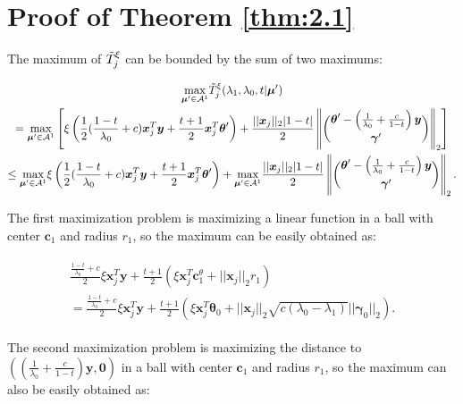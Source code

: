 \section{Proof of Theorem \ref{thm:2.1}}

The maximum of $\Tilde{T}^\xi_j$ can be bounded by the sum of two maximums:

\begin{equation}
    \begin{gathered}
        \underset{\boldsymbol\mu'\in\mathcal{A}^1}{\mathrm{max}}\Tilde{T}^\xi_j(\lambda_1,\lambda_0,t|\boldsymbol\mu')\\
        =\underset{\boldsymbol\mu'\in\mathcal{A}^1}{\mathrm{max}}\left[\xi\left( \frac{1}{2}(\frac{1-t}{\lambda_0}+c)\boldsymbol x_j^T\boldsymbol y+\frac{t+1}{2}\boldsymbol x_j^T\boldsymbol\theta'\right)+\frac{||\boldsymbol x_j||_2|1-t|}{2}\left\Vert\binom{\boldsymbol\theta'-\left(\frac{1}{\lambda_0}+\frac{c}{1-t}\right)\boldsymbol y}{\boldsymbol\gamma'}\right\Vert_2\right]\\
        \leq \underset{\boldsymbol\mu'\in\mathcal{A}^1}{\mathrm{max}}\xi\left( \frac{1}{2}(\frac{1-t}{\lambda_0}+c)\boldsymbol x_j^T\boldsymbol y+\frac{t+1}{2}\boldsymbol x_j^T\boldsymbol\theta'\right)+\underset{\boldsymbol\mu'\in\mathcal{A}^1}{\mathrm{max}}\frac{||\boldsymbol x_j||_2|1-t|}{2}\left\Vert\binom{\boldsymbol\theta'-\left(\frac{1}{\lambda_0}+\frac{c}{1-t}\right)\boldsymbol y}{\boldsymbol\gamma'}\right\Vert_2.
    \end{gathered}
\end{equation}

The first maximization problem is maximizing a linear function in a ball with center $\boldsymbol c_1$ and radius $r_1$, so the maximum can be easily obtained as:

\begin{gather}
    \begin{aligned}
        \frac{\frac{1-t}{\lambda_0}+c}{2}\xi\boldsymbol x_j^T \boldsymbol y+\frac{t+1}{2}\left(\xi \boldsymbol x_j^T \boldsymbol c_1^\theta+||\boldsymbol x_j||_2r_1\right)\\
        =\frac{\frac{1-t}{\lambda_0}+c}{2}\xi\boldsymbol x_j^T \boldsymbol y+\frac{t+1}{2}\left(\xi \boldsymbol x_j^T \boldsymbol \theta_{0}+||\boldsymbol x_j||_2\sqrt{c(\lambda_0-\lambda_1)}||\boldsymbol\gamma_{0}||_2\right).
    \end{aligned}
\end{gather}

The second maximization problem is maximizing the distance to $\left((\frac{1}{\lambda_0}+\frac{c}{1-t})\boldsymbol y,\boldsymbol 0\right)$ in a ball with center $\boldsymbol c_1$ and radius $r_1$, so the maximum can also be easily obtained as:

